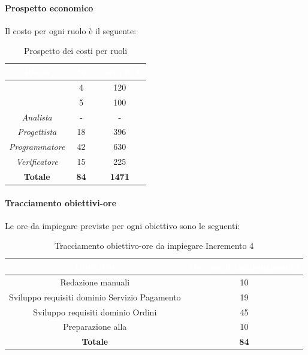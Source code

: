 \paragraph*{Prospetto economico}
Il costo per ogni ruolo è il seguente:
\begin{table}[H]
	\begin{center}
		\begin{tabular}{ |c c c| }
			\rowcolor{darkblue} 
			\textcolor{white}{\textbf{Ruolo}} & \textcolor{white}{\textbf{Ore}} & \textcolor{white}{\textbf{Costo in €}}\\ \hline
		{\Responsabile} 			& 4 	& 120 \\ \hline
		{\Amministratore}		 	& 5 	& 100 \\ \hline
		\textit{Analista} 			& - 	& - \\ \hline
		\textit{Progettista} 		& 18 	& 396 \\ \hline
		\textit{Programmatore}  	& 42 	& 630 \\ \hline
		\textit{Verificatore} 		& 15 	& 225 \\ \hline
		\textbf{Totale} & \textbf{84} & \textbf{1471} \\ \hline
		\end{tabular}
		\caption{Prospetto dei costi per ruoli}
	\end{center}
\end{table}
\paragraph*{Tracciamento obiettivi-ore}
Le ore da impiegare previste per ogni obiettivo sono le seguenti:
\begin{table}[H]
	\begin{center}
		\begin{tabular}{ |c c| }
			\rowcolor{darkblue} 
			\textcolor{white}{\textbf{Obiettivo}}	& \textcolor{white}{\textbf{Ore per il raggiungimento}} \\ \hline
			{Redazione manuali} 					& 10 	\\ \hline
			{Sviluppo requisiti dominio Servizio Pagamento}&  19	\\ \hline
			{Sviluppo requisiti dominio Ordini} 	& 45 	\\ \hline
			{Preparazione alla \glo{RQ}} 			& 10 	\\ \hline
			\textbf{Totale} 						& \textbf{84}  \\ \hline
		\end{tabular}
		\caption{Tracciamento obiettivo-ore da impiegare Incremento 4}
	\end{center}
\end{table}
